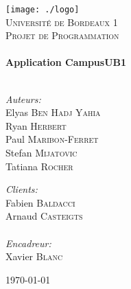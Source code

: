 \begin{titlepage}
\begin{center}

\texttt{[image: ./logo]}~\\[1cm]

\textsc{\LARGE Université de Bordeaux 1}\\[1.5cm]

\textsc{\Large {Projet de Programmation}}\\[0.5cm]

\HRule \\[0.4cm]
{ \huge \bfseries Application CampusUB1}\\[0.4cm]

\HRule \\[1.5cm]

\begin{minipage}{0.4\textwidth}
\begin{flushleft} \large
\emph{Auteurs:} \\
Elyas \textsc{Ben Hadj Yahia}\\
Ryan \textsc{Herbert}\\
Paul \textsc{Maribon-Ferret}\\
Stefan \textsc{Mijatovic}\\
Tatiana \textsc{Rocher}
\end{flushleft}
\end{minipage}
\begin{minipage}{0.4\textwidth}
\begin{flushright} \large
\emph{Clients:} \\
Fabien \textsc{Baldacci}\\
Arnaud \textsc{Casteigts}\\
\emph{\\Encadreur:} \\
Xavier \textsc{Blanc}
\end{flushright}
\end{minipage}

\vfill

{\large \today}

\end{center}
\end{titlepage}